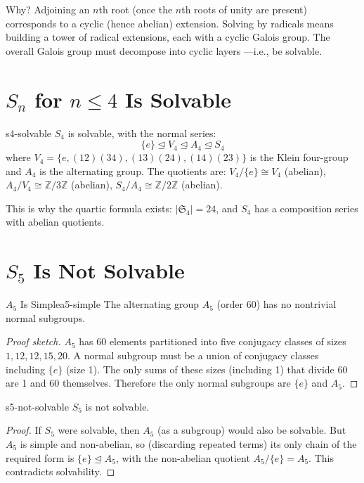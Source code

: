 \documentclass[11pt, a4paper, oneside]{book}
\newcommand{\Z}{\mathbb{Z}}
\newcommand{\Sym}{\mathfrak{S}}
\newcommand{\normal}{\trianglelefteq}
\newcommand{\iso}{\cong}
\begin{document}
Why? Adjoining an $n$th root (once the $n$th roots of unity are present)
corresponds to a cyclic (hence abelian) extension.
Solving by radicals means building a tower of radical extensions, each with a
cyclic Galois group. The overall Galois group must decompose into cyclic layers
---i.e., be solvable.

\section{$S_n$ for $n \leq 4$ Is Solvable}

\begin{prop}{}{s4-solvable}
$S_4$ is solvable, with the normal series:
\[
  \{e\} \normal V_4 \normal A_4 \normal S_4
\]
where $V_4 = \{e, (12)(34), (13)(24), (14)(23)\}$ is the Klein four-group
and $A_4$ is the alternating group. The quotients are:
$V_4/\{e\} \iso V_4$ (abelian), $A_4/V_4 \iso \Z/3\Z$ (abelian),
$S_4/A_4 \iso \Z/2\Z$ (abelian).
\end{prop}

This is why the quartic formula exists: $|\Sym_4| = 24$, and $S_4$ has a
composition series with abelian quotients.

\section{$S_5$ Is Not Solvable}

\begin{thm}{$A_5$ Is Simple}{a5-simple}
The alternating group $A_5$ (order 60) has no nontrivial normal subgroups.
\end{thm}

\begin{proof}[Proof sketch]
$A_5$ has 60 elements partitioned into five conjugacy classes of sizes
$1, 12, 12, 15, 20$. A normal subgroup must be a union of conjugacy classes
including $\{e\}$ (size 1). The only sums of these sizes (including 1) that
divide 60 are 1 and 60 themselves. Therefore the only normal subgroups are
$\{e\}$ and $A_5$.
\end{proof}

\begin{cor}{}{s5-not-solvable}
$S_5$ is not solvable.
\end{cor}

\begin{proof}
If $S_5$ were solvable, then $A_5$ (as a subgroup) would also be solvable.
But $A_5$ is simple and non-abelian, so (discarding repeated terms) its only
chain of the required form is $\{e\} \normal A_5$, with the non-abelian quotient $A_5/\{e\} = A_5$.
This contradicts solvability.
\end{proof}
\end{document}
